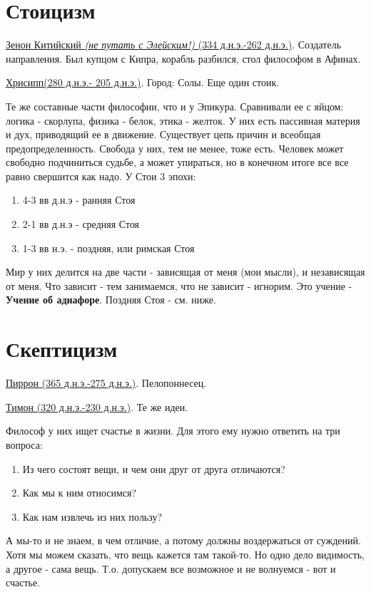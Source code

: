 \section{Стоицизм}
\underline{Зенон Китийский \textit{(не путать с Элейским!)} (334 д.н.э.-262 д.н.э.)}. Создатель направления. Был купцом с Кипра, корабль разбился, стол философом в Афинах. 

\underline{Хрисипп(280 д.н.э.- 205 д.н.э.)}. Город: Солы. Еще один стоик.

Те же составные части философии, что и у Эпикура. Сравнивали ее с яйцом: логика - скорлупа, физика - белок, этика - желток.
У них есть пассивная материя и дух, приводящий ее в движение. Существует цепь причин и всеобщая предопределенность. Свобода у них, тем не менее, тоже есть. Человек может свободно подчиниться судьбе, а может упираться, но в конечном итоге все все равно свершится как надо. У Стои 3 эпохи:
\begin{enumerate}
\item 4-3 вв д.н.э - ранняя Стоя
\item 2-1 вв д.н.э - средняя Стоя
\item 1-3 вв н.э. - поздняя, или римская Стоя
\end{enumerate}
Мир у них делится на две части - зависящая от меня (мои мысли), и независящая от меня.
Что зависит - тем занимаемся, что не зависит - игнорим. Это учение - \textbf{Учение об адиафоре}.
Поздняя Стоя - см. ниже.

\section{Скептицизм}
\underline{Пиррон (365 д.н.э.-275 д.н.э.)}. Пелопоннесец.

\underline{Тимон (320 д.н.э.-230 д.н.э.)}. Те же идеи.

Философ у них ищет счастье в жизни. Для этого ему нужно ответить на три вопроса:
\begin{enumerate}
\item Из чего состоят вещи, и чем они друг от друга отличаются?
\item Как мы к ним относимся?
\item Как нам извлечь из них пользу?
\end{enumerate}
А мы-то и не знаем, в чем отличие, а потому должны воздержаться от суждений. Хотя мы можем сказать, что вещь кажется там такой-то. Но одно дело видимость, а другое - сама вещь. Т.о. допускаем все возможное и не волнуемся - вот и счастье.

